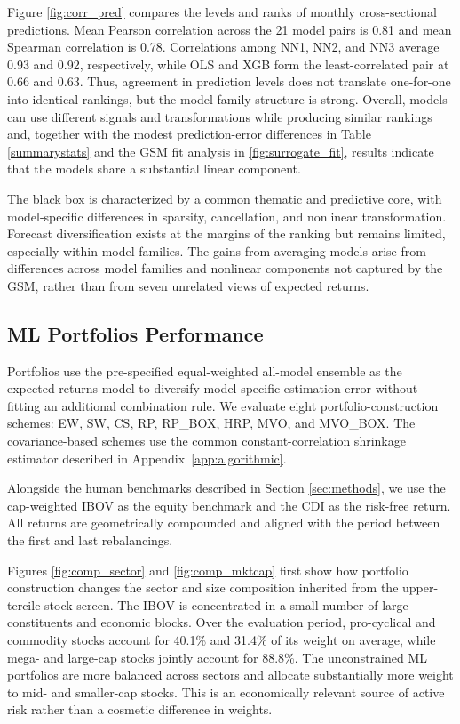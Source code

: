 \documentclass[preprint,12pt,authoryear]{elsarticle}
\begin{document}
Figure \ref{fig:corr_pred} compares the levels and ranks of monthly cross-sectional predictions. Mean Pearson correlation across the 21 model pairs is 0.81 and mean Spearman correlation is 0.78. Correlations among NN1, NN2, and NN3 average 0.93 and 0.92, respectively, while OLS and XGB form the least-correlated pair at 0.66 and 0.63. Thus, agreement in prediction levels does not translate one-for-one into identical rankings, but the model-family structure is strong. Overall, models can use different signals and transformations while producing similar rankings and, together with the modest prediction-error differences in Table \ref{summarystats} and the GSM fit analysis in \ref{fig:surrogate_fit}, results indicate that the models share a substantial linear component.

The black box is characterized by a common thematic and predictive core, with model-specific differences in sparsity, cancellation, and nonlinear transformation. Forecast diversification exists at the margins of the ranking but remains limited, especially within model families. The gains from averaging models arise from differences across model families and nonlinear components not captured by the GSM, rather than from seven unrelated views of expected returns.

\subsection{ML Portfolios Performance}
Portfolios use the pre-specified equal-weighted all-model ensemble as the expected-returns model to diversify model-specific estimation error without fitting an additional combination rule. We evaluate eight portfolio-construction schemes: EW, SW, CS, RP, RP\_BOX, HRP, MVO, and MVO\_BOX. The covariance-based schemes use the common constant-correlation shrinkage estimator described in Appendix~\ref{app:algorithmic}.

Alongside the human benchmarks described in Section \ref{sec:methods}, we use the cap-weighted IBOV as the equity benchmark and the CDI as the risk-free return. All returns are geometrically compounded and aligned with the period between the first and last rebalancings.

Figures \ref{fig:comp_sector} and \ref{fig:comp_mktcap} first show how portfolio construction changes the sector and size composition inherited from the upper-tercile stock screen. The IBOV is concentrated in a small number of large constituents and economic blocks. Over the evaluation period, pro-cyclical and commodity stocks account for 40.1\% and 31.4\% of its weight on average, while mega- and large-cap stocks jointly account for 88.8\%. The unconstrained ML portfolios are more balanced across sectors and allocate substantially more weight to mid- and smaller-cap stocks. This is an economically relevant source of active risk rather than a cosmetic difference in weights.
\end{document}
